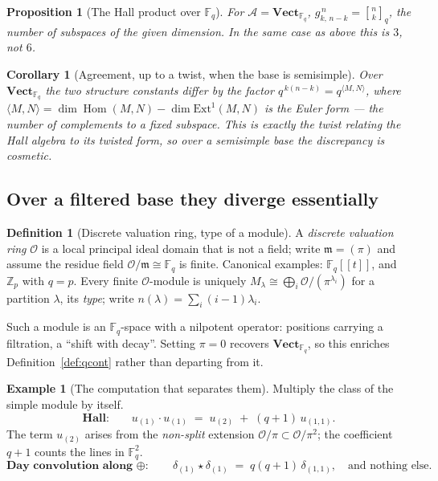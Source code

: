 \documentclass[11pt,a4paper]{article}
\newtheorem{proposition}[theorem]{Proposition}
\newtheorem{corollary}[theorem]{Corollary}
\theoremstyle{definition}
\newtheorem{definition}[theorem]{Definition}
\newtheorem{example}[theorem]{Example}
\theoremstyle{remark}
\newcommand{\FF}{\mathbb{F}}
\newcommand{\ZZ}{\mathbb{Z}}
\newcommand{\cat}[1]{\mathbf{#1}}
\newcommand{\Vect}{\cat{Vect}}
\DeclareMathOperator{\Hom}{Hom}
\newcommand{\qbin}[2]{\genfrac{[}{]}{0pt}{}{#1}{#2}_{q}}
\begin{document}
\begin{proposition}[The Hall product over $\FF_q$]\label{prop:thin}
For $\mathcal{A} = \Vect_{\FF_q}$, $g^{\,n}_{k,\,n-k} = \qbin{n}{k}$, the number of
subspaces of the given dimension. In the same case as above this is $3$, not $6$.
\end{proposition}

\begin{corollary}[Agreement, up to a twist, when the base is semisimple]
Over $\Vect_{\FF_q}$ the two structure constants differ by the factor
$q^{\,k(n-k)} = q^{\langle M, N\rangle}$, where
$\langle M,N\rangle = \dim\Hom(M,N) - \dim\mathrm{Ext}^1(M,N)$ is the Euler form
--- the number of complements to a fixed subspace. This is exactly the twist
relating the Hall algebra to its twisted form, so over a semisimple base the
discrepancy is cosmetic.
\end{corollary}

\subsection{Over a filtered base they diverge essentially}\label{sec:diverge}

\begin{definition}[Discrete valuation ring, type of a module]
A \emph{discrete valuation ring} $\mathcal{O}$ is a local principal ideal domain
that is not a field; write $\mathfrak{m} = (\pi)$ and assume the residue field
$\mathcal{O}/\mathfrak{m} \cong \FF_q$ is finite. Canonical examples:
$\FF_q[[t]]$, and $\ZZ_p$ with $q = p$. Every finite $\mathcal{O}$-module is
uniquely $M_\lambda \cong \bigoplus_i \mathcal{O}/(\pi^{\lambda_i})$ for a
partition $\lambda$, its \emph{type}; write $n(\lambda) = \sum_i (i-1)\lambda_i$.
\end{definition}

Such a module is an $\FF_q$-space with a nilpotent operator: positions carrying a
filtration, a ``shift with decay''. Setting $\pi = 0$ recovers
$\Vect_{\FF_q}$, so this enriches Definition~\ref{def:qcont} rather than
departing from it.

\begin{example}[The computation that separates them]\label{ex:separate}
Multiply the class of the simple module by itself.
\[
  \textbf{Hall:}\qquad
  u_{(1)} \cdot u_{(1)} \;=\; u_{(2)} \;+\; (q+1)\, u_{(1,1)} .
\]
The term $u_{(2)}$ arises from the \emph{non-split} extension
$\mathcal{O}/\pi \subset \mathcal{O}/\pi^{2}$; the coefficient $q+1$ counts the
lines in $\FF_q^{2}$.
\[
  \textbf{Day convolution along } \oplus:\qquad
  \delta_{(1)} \star \delta_{(1)} \;=\; q(q+1)\, \delta_{(1,1)},
  \quad\text{and nothing else.}
\]
\end{example}
\end{document}
